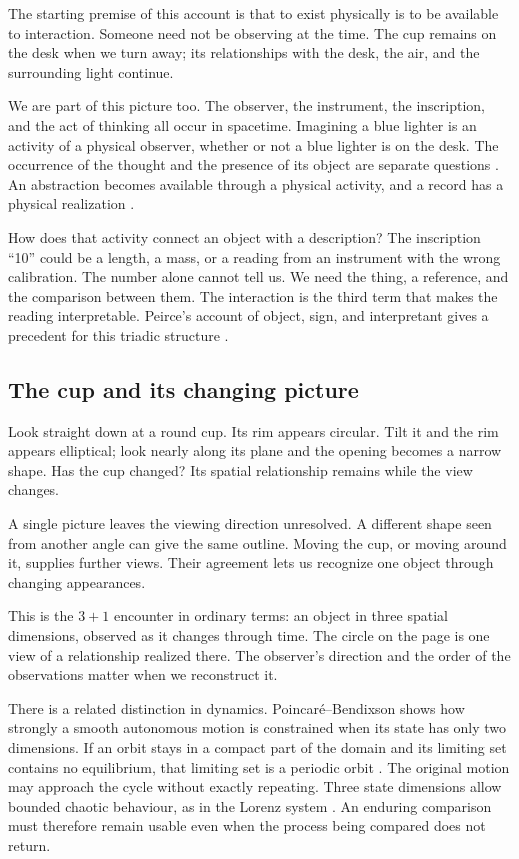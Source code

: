 \documentclass[11pt,a4paper]{article}
\theoremstyle{definition}
\begin{document}
The starting premise of this account is that to exist physically is
to be available to interaction. Someone need not be observing at the
time. The cup remains on the desk when we turn away; its relationships
with the desk, the air, and the surrounding light continue.

We are part of this picture too. The observer, the instrument, the
inscription, and the act of thinking all occur in spacetime. Imagining
a blue lighter is an activity of a physical observer, whether or not
a blue lighter is on the desk. The occurrence of the thought and the
presence of its object are separate questions \citep{Russell1905}.
An abstraction becomes available through a physical activity, and a
record has a physical realization \citep{Landauer1996}.

How does that activity connect an object with a description? The
inscription ``10'' could be a length, a mass, or a reading from an
instrument with the wrong calibration. The number alone cannot tell
us. We need the thing, a reference, and the comparison between them.
The interaction is the third term that makes the reading interpretable.
Peirce's account of object, sign, and interpretant gives a precedent
for this triadic structure \citep[\S\S2.228, 2.274]{Peirce1932}.

\subsection{The cup and its changing picture}

Look straight down at a round cup. Its rim appears circular. Tilt it
and the rim appears elliptical; look nearly along its plane and the
opening becomes a narrow shape. Has the cup changed? Its spatial
relationship remains while the view changes.

A single picture leaves the viewing direction unresolved. A different
shape seen from another angle can give the same outline. Moving the
cup, or moving around it, supplies further views. Their agreement lets
us recognize one object through changing appearances.

This is the $3+1$ encounter in ordinary terms: an object in three
spatial dimensions, observed as it changes through time. The circle
on the page is one view of a relationship realized there. The
observer's direction and the order of the observations matter when
we reconstruct it.

There is a related distinction in dynamics. Poincar\'e--Bendixson
shows how strongly a smooth autonomous motion is constrained when
its state has only two dimensions. If an orbit stays in a compact
part of the domain and its limiting set contains no equilibrium,
that limiting set is a periodic orbit
\citep[Theorem~8.8]{Sideris2013}. The original motion may approach
the cycle without exactly repeating. Three state dimensions allow
bounded chaotic behaviour, as in the Lorenz system \citep{Tucker2002}.
An enduring comparison must therefore remain usable even when the
process being compared does not return.
\end{document}

